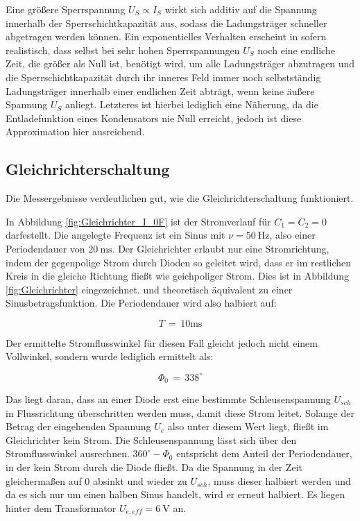 \documentclass[10pt,a4paper]{scrartcl}
\begin{document}
Eine größere Sperrspannung $U_S\propto I_S$ wirkt sich additiv auf die
Spannung innerhalb der Sperrschichtkapazität aus,
sodass die Ladungsträger schneller abgetragen werden können.
Ein exponentielles Verhalten erscheint in sofern realistisch,
dass selbst bei sehr hohen Sperrspannungen $U_S$ noch eine endliche Zeit,
die größer als Null ist, benötigt wird,
um alle Ladungsträger abzutragen und die Sperrschichtkapazität durch
ihr inneres Feld immer noch selbstständig Ladungsträger innerhalb einer
endlichen Zeit abträgt, wenn keine äußere Spannung $U_S$ anliegt.
Letzteres ist hierbei lediglich eine Näherung,
da die Entladefunktion eines Kondensators nie Null erreicht,
jedoch ist diese Approximation hier ausreichend.

\subsection {Gleichrichterschaltung}

Die Messergebnisse verdeutlichen gut, wie die Gleichrichterschaltung
funktioniert.

In Abbildung \ref{fig:Gleichrichter_I_0F} ist der Stromverlauf für
$C_1=C_2=0$ darfestellt.
Die angelegte Frequenz ist ein Sinus mit $\nu=50~\mathrm{Hz}$,
also einer Periodendauer von $20~\mathrm{ms}$.
Der Gleichrichter erlaubt nur eine Stromrichtung,
indem der gegenpolige Strom durch Dioden so geleitet wird,
dass er im restlichen Kreis in die gleiche Richtung fließt
wie geichpoliger Strom.
Dies ist in Abbildung \ref{fig:Gleichrichter} eingezeichnet.
und theoretisch äquivalent zu einer Sinusbetragsfunktion.
Die Periodendauer wird also halbiert auf:

\begin{equation}
    \boxed{T\,=\,10\mathrm{ms}}
\end{equation}

Der ermittelte Stromflusswinkel für diesen Fall gleicht jedoch nicht einem
Vollwinkel, sondern wurde lediglich ermittelt als:

\begin{equation}
    \boxed{\Phi_0\,=\,338^\circ}
\end{equation}

Das liegt daran, dass an einer Diode erst eine bestimmte Schleusenspannung
$U_{sch}$
in Flussrichtung überschritten werden muss, damit diese Strom leitet.
Solange der Betrag der eingehenden Spannung $U_e$ also unter diesem Wert liegt,
fließt im Gleichrichter kein Strom.
Die Schleusenspannung lässt sich über den Stromflusswinkel ausrechnen.
$360^\circ-\Phi_0$ entspricht dem Anteil der Periodendauer,
in der kein Strom durch die Diode fließt.
Da die Spannung in der Zeit gleichermaßen auf 0 absinkt und wieder zu
$U_{sch}$, muss dieser halbiert werden und da es sich nur um einen
halben Sinus handelt, wird er erneut halbiert.
Es liegen hinter dem Transformator $U_{e,eff}=6~\mathrm V$ an.
\end{document}
